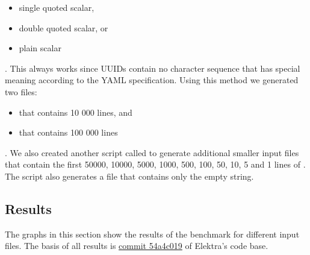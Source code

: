 \begin{itemize}
  \item single quoted scalar,
  \item double quoted scalar, or
  \item plain scalar
\end{itemize}

. This always works since \glspl{UUID} contain no character sequence that has special meaning according to the YAML specification. Using this method we generated two files:

\begin{itemize}
  \item \FileGenerated{} that contains 10 000 lines, and

  \item \FileGeneratedHundredThousand{} that contains 100 000 lines
\end{itemize}

. We also created another script called \FileCutInput{} to generate additional smaller input files that contain the first 50000, 10000, 5000, 1000, 500, 100, 50, 10, 5 and 1 lines of \FileGeneratedHundredThousand{}. The script also generates a file that contains only the empty string.

\subsection{Results}

The graphs in this section show the results of the benchmark for different input files. The basis of all results is \href{https://github.com/ElektraInitiative/libelektra/commit/54a4c0194946917b7d093e0777f465619b2f3d6f}{commit 54a4c019} of Elektra’s code base.

